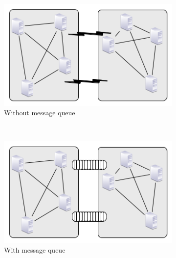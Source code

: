 \documentclass{vldb}
\begin{document}
\begin{figure}
    \caption{Different system designs to link data generator and SUT.}
    \centering
    \begin{subfigure}[b]{0.4\textwidth}
        \includegraphics[width=\textwidth]{no_queue}
        \caption{Without message queue}
        \label{fig_no_queue}
    \end{subfigure}
    ~ %
    \begin{subfigure}[b]{0.4\textwidth}
        \includegraphics[width=\textwidth]{yes_queue}
        \caption{With message queue}
        \label{fig_yes_queue}
    \end{subfigure}
    ~ %
    \begin{subfigure}[b]{0.4\textwidth}

\end{subfigure}
\end{figure}
\end{document}
